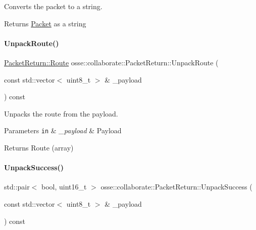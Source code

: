 Converts the packet to a string. 

\begin{DoxyReturn}{Returns}
\hyperlink{classosse_1_1collaborate_1_1_packet}{Packet} as a string 
\end{DoxyReturn}
\mbox{\label{classosse_1_1collaborate_1_1_packet_return_ae430891dd740edab4984a0279816797c}} 
\paragraph{\texorpdfstring{Unpack\+Route()}{UnpackRoute()}}
{\footnotesize\ttfamily \hyperlink{classosse_1_1collaborate_1_1_packet_return_a1c00d25b9e8d526be915c28b8ee0ba3b}{Packet\+Return\+::\+Route} osse\+::collaborate\+::\+Packet\+Return\+::\+Unpack\+Route (\begin{DoxyParamCaption}\item[{const std\+::vector$<$ uint8\+\_\+t $>$ \&}]{\+\_\+payload }\end{DoxyParamCaption}) const\hspace{0.3cm}{\ttfamily [private]}}



Unpacks the route from the payload. 


\begin{DoxyParams}[1]{Parameters}
\mbox{\tt in}  & {\em \+\_\+payload} & Payload \\
\hline
\end{DoxyParams}
\begin{DoxyReturn}{Returns}
Route (array) 
\end{DoxyReturn}
\mbox{\label{classosse_1_1collaborate_1_1_packet_return_a89a3e35f9caf7dc3cfe13533ae8b538f}} 
\paragraph{\texorpdfstring{Unpack\+Success()}{UnpackSuccess()}}
{\footnotesize\ttfamily std\+::pair$<$ bool, uint16\+\_\+t $>$ osse\+::collaborate\+::\+Packet\+Return\+::\+Unpack\+Success (\begin{DoxyParamCaption}\item[{const std\+::vector$<$ uint8\+\_\+t $>$ \&}]{\+\_\+payload }\end{DoxyParamCaption}) const\hspace{0.3cm}{\ttfamily [private]}}



